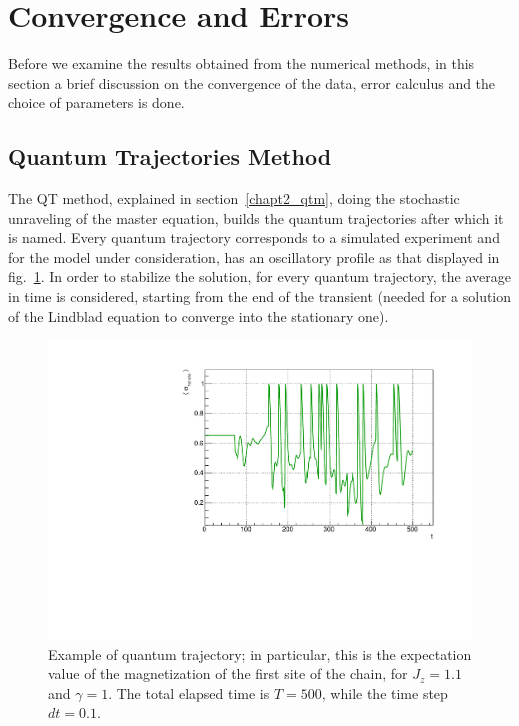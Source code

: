 \section{Convergence and Errors}
Before we examine the results obtained from the numerical methods, in this section a brief discussion on the convergence of the data, error calculus and the choice of parameters is done.

\subsection{Quantum Trajectories Method}
The QT method, explained in section~\ref{chapt2_qtm}, doing the stochastic unraveling of the master equation, builds the quantum trajectories after which it is named.  Every quantum trajectory corresponds to a simulated experiment and for the model under consideration, has an oscillatory profile as that displayed in fig.~\ref{fig:SS_s8J10511}. In order to stabilize the solution, for every quantum trajectory, the average in time is considered, starting from the end of the transient (needed for a solution of the Lindblad equation to converge into the stationary one).

\begin{figure}[H]
    \centering
    \includegraphics[scale=0.7]{Figures/SS_s8J10511.pdf}
    \caption{Example of quantum trajectory; in particular, this is the expectation value of the magnetization of the first site of the chain, for $J_z = 1.1$ and $\gamma = 1$. The total elapsed time is $T=500$, while the time step $dt = 0.1$.}
    \label{fig:SS_s8J10511}
\end{figure}


